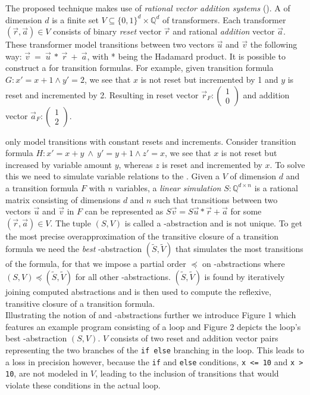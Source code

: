 The proposed technique makes use of \textsl{rational vector addition systems} (\qvasr). A \qvasr of dimension $d$ is a finite set $V \subseteq \{0, 1\}^d \times \mathbb{Q}^d$ of transformers. Each transformer $(\vec{r}, \vec{a}) \in V$ consists of binary \textsl{reset} vector $\vec{r}$ and rational \textsl{addition} vector $\vec{a}$. These transformer model transitions between two vectors $\vec{u}$ and $\vec{v}$ the following way: $\vec{v}\ =\ \vec{u}\ *\ \vec{r}\ +\ \vec{a}$, with * being the Hadamard product. It is possible to construct a \qvasr for transition formulas. For example, given transition formula $G: x' = x + 1 \land y' = 2$, we see that $x$ is not reset but incremented by 1 and $y$ is reset and incremented by 2. Resulting in reset vector $\vec{r}_F: \begin{pmatrix} 1 \\ 0\end{pmatrix}$ and addition vector $\vec{a}_F: \begin{pmatrix} 1 \\ 2\end{pmatrix}$. \par
\qvasr only model transitions with constant resets and increments. Consider transition formula $H: x' = x + y\ \land\ y' = y + 1 \land z' = x$, we see that $x$ is not reset but increased by variable amount $y$, whereas $z$ is reset and incremented by $x$. To solve this we need to simulate variable relations to the \qvasr. Given a \qvasr $V$ of dimension $d$ and a transition formula $F$ with $n$ variables, a \textsl{linear simulation} $S: \mathbb{Q}^{d \times n} $ is a rational matrix consisting of dimensions $d$ and $n$ such that transitions between two vectors $\vec{u}$ and $\vec{v}$ in $F$ can be represented as $S\vec{v} = S\vec{u} * \vec{r} + \vec{a}$ for some $(\vec{r}, \vec{a}) \in V$. The tuple $(S, V)$ is called a \qvasr-abstraction and is not unique. To get the most precise overapproximation of the transitive closure of a transition formula we need the \textsl{best} \qvasr-abstraction $(\tilde{S}, \tilde{V})$ that simulates the most transitions of the formula, for that we impose a partial order $\preceq$ on \qvasr-abstractions where $(S, V) \preceq (\tilde{S}, \tilde{V})$ for all other \qvasr-abstractions. $(\tilde{S}, \tilde{V})$ is found by iteratively joining computed abstractions and is then used to compute the reflexive, transitive closure of a transition formula. \\ Illustrating the notion of \qvasr and \qvasr-abstractions further we introduce Figure 1 which features an example program consisting of a loop and Figure 2 depicts the loop's best \qvasr-abstraction $(S,V)$. $V$ consists of two reset and addition vector pairs representing the two branches of the \texttt{if else} branching in the loop. This leads to a loss in precision however, because the \texttt{if} and \texttt{else} conditions, \texttt{x <= 10} and \texttt{x > 10}, are not modeled in $V$, leading to the inclusion of transitions that would violate these conditions in the actual loop. \\
